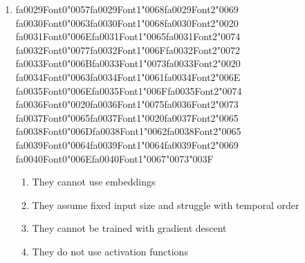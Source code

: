 \documentclass[12pt]{article}
\begin{document}
\begin{enumerate}[label=Q\arabic*.]
\begin{enumerate}[label=(\Alph*)]
    \item To increase the speed of the training process
    \item To allow the model to handle variable-length sequences
\end{enumerate}
\item {\csname fa0029Font0\endcsname\char"0057}{\csname fa0029Font1\endcsname\char"0068}{\csname fa0029Font2\endcsname\char"0069} {\csname fa0030Font0\endcsname\char"0063}{\csname fa0030Font1\endcsname\char"0068}{\csname fa0030Font2\endcsname\char"0020} {\csname fa0031Font0\endcsname\char"006E}{\csname fa0031Font1\endcsname\char"0065}{\csname fa0031Font2\endcsname\char"0074} {\csname fa0032Font0\endcsname\char"0077}{\csname fa0032Font1\endcsname\char"006F}{\csname fa0032Font2\endcsname\char"0072} {\csname fa0033Font0\endcsname\char"006B}{\csname fa0033Font1\endcsname\char"0073}{\csname fa0033Font2\endcsname\char"0020} {\csname fa0034Font0\endcsname\char"0063}{\csname fa0034Font1\endcsname\char"0061}{\csname fa0034Font2\endcsname\char"006E} {\csname fa0035Font0\endcsname\char"006E}{\csname fa0035Font1\endcsname\char"006F}{\csname fa0035Font2\endcsname\char"0074} {\csname fa0036Font0\endcsname\char"0020}{\csname fa0036Font1\endcsname\char"0075}{\csname fa0036Font2\endcsname\char"0073} {\csname fa0037Font0\endcsname\char"0065}{\csname fa0037Font1\endcsname\char"0020}{\csname fa0037Font2\endcsname\char"0065} {\csname fa0038Font0\endcsname\char"006D}{\csname fa0038Font1\endcsname\char"0062}{\csname fa0038Font2\endcsname\char"0065} {\csname fa0039Font0\endcsname\char"0064}{\csname fa0039Font1\endcsname\char"0064}{\csname fa0039Font2\endcsname\char"0069} {\csname fa0040Font0\endcsname\char"006E}{\csname fa0040Font1\endcsname\char"0067}{\char"0073}{\char"003F}
\begin{enumerate}[label=(\Alph*)]
    \item They cannot use embeddings
    \item They assume fixed input size and struggle with temporal order
    \item They cannot be trained with gradient descent
    \item They do not use activation functions
\end{enumerate}

\end{enumerate}
\end{document}
